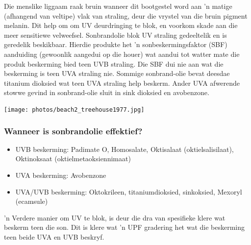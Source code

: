 \label{m38779*id189495}Die menslike liggaam raak bruin wanneer dit bootgestel word aan 'n matige (afhangend van veltipe) vlak van straling, deur die vrystel van die bruin pigment melanin. Dit help om om UV deurdringing te blok, en voorkom skade aan die meer sensitiewe velweefsel. Sonbrandolie blok UV straling gedeeltelik en is geredelik beskikbaar. Hierdie produkte het 'n sonbeskermingsfaktor (SBF) aanduiding (gewoonlik aangedui op die houer) wat aandui tot watter mate die produk beskerming bied teen UVB straling. Die SBF dui nie aan wat die beskerming is teen UVA straling nie. Sommige sonbrand-olie bevat deesdae titanium dioksied wat teen UVA straling help beskerm. Ander UVA afwerende stowwe gevind in sonbrand-olie sluit in sink dioksied en avobenzone. \par 
\label{m38779*secfhsst!!!underscore!!!id701}
\begin{minipage}{.5\textwidth}
\texttt{[image: photos/beach2\_treehouse1977.jpg]}
\end{minipage}
\begin{minipage}{.5\textwidth}
            \subsubsection*{Wanneer is sonbrandolie effektief?}
            \nopagebreak
        \label{m38779*id189518}\begin{itemize}[noitemsep]
            \label{m38779*uid18}\item UVB beskerming: Padimate O, Homosalate, Oktisalaat (oktielsalisilaat), Oktinoksaat (oktielmetaoksiennimaat)
\label{m38779*uid19}\item UVA beskerming: Avobenzone
\label{m38779*uid20}\item UVA/UVB beskerming: Oktokrileen, titaniumdioksied, sinkoksied, Mexoryl (ecamsule)
\end{itemize}
        \label{m38779*id189561} 'n Verdere manier om UV te blok, is deur die dra van spesifieke klere wat beskerm teen die son. Dit is klere wat 'n UPF gradering het wat die beskerming teen beide UVA en UVB beskryf. \par 
      \label{m38779*uid21}
\end{minipage}
